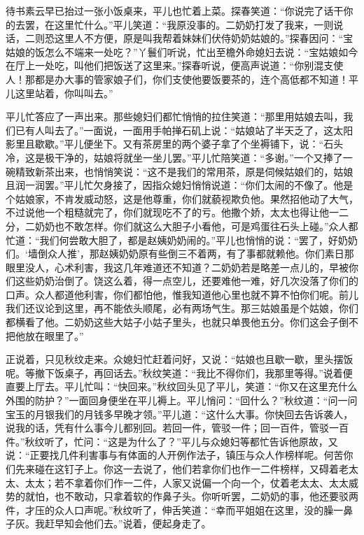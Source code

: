 待书素云早已抬过一张小饭桌来，平儿也忙着上菜。探春笑道：``你说完了话干你的去罢，在这里忙什么。''平儿笑道：``我原没事的。二奶奶打发了我来，一则说话，二则恐这里人不方便，原是叫我帮着妹妹们伏侍奶奶姑娘的。''探春因问：``宝姑娘的饭怎么不端来一处吃？''丫鬟们听说，忙出至檐外命媳妇去说：``宝姑娘如今在厅上一处吃，叫他们把饭送了这里来。''探春听说，便高声说道：``你别混支使人！那都是办大事的管家娘子们，你们支使他要饭要茶的，连个高低都不知道！平儿这里站着，你叫叫去。''

平儿忙答应了一声出来。那些媳妇们都忙悄悄的拉住笑道：``那里用姑娘去叫，我们已有人叫去了。''一面说，一面用手帕掸石矶上说：``姑娘站了半天乏了，这太阳影里且歇歇。''平儿便坐下。又有茶房里的两个婆子拿了个坐褥铺下，说：``石头冷，这是极干净的，姑娘将就坐一坐儿罢。''平儿忙陪笑道：``多谢。''一个又捧了一碗精致新茶出来，也悄悄笑说：``这不是我们的常用茶，原是伺候姑娘们的，姑娘且润一润罢。''平儿忙欠身接了，因指众媳妇悄悄说道：``你们太闹的不像了。他是个姑娘家，不肯发威动怒，这是他尊重，你们就藐视欺负他。果然招他动了大气，不过说他一个粗糙就完了，你们就现吃不了的亏。他撒个娇，太太也得让他一二分，二奶奶也不敢怎样。你们就这么大胆子小看他，可是鸡蛋往石头上碰。''众人都忙道：``我们何尝敢大胆了，都是赵姨奶奶闹的。''平儿也悄悄的说：``罢了，好奶奶们。`墙倒众人推'，那赵姨奶奶原有些倒三不着两，有了事都就赖他。你们素日那眼里没人，心术利害，我这几年难道还不知道？二奶奶若是略差一点儿的，早被你们这些奶奶治倒了。饶这么着，得一点空儿，还要难他一难，好几次没落了你们的口声。众人都道他利害，你们都怕他，惟我知道他心里也就不算不怕你们呢。前儿我们还议论到这里，再不能依头顺尾，必有两场气生。那三姑娘虽是个姑娘，你们都横看了他。二奶奶这些大姑子小姑子里头，也就只单畏他五分。你们这会子倒不把他放在眼里了。''

正说着，只见秋纹走来。众媳妇忙赶着问好，又说：``姑娘也且歇一歇，里头摆饭呢。等撤下饭桌子，再回话去。''秋纹笑道：``我比不得你们，我那里等得。''说着便直要上厅去。平儿忙叫：``快回来。''秋纹回头见了平儿，笑道：``你又在这里充什么外围的防护？''一面回身便坐在平儿褥上。平儿悄问：``回什么？''秋纹道：``问一问宝玉的月银我们的月钱多早晚才领。''平儿道：``这什么大事。你快回去告诉袭人，说我的话，凭有什么事今儿都别回。若回一件，管驳一件；回一百件，管驳一百件。''秋纹听了，忙问：``这是为什么了？''平儿与众媳妇等都忙告诉他原故，又说：``正要找几件利害事与有体面的人开例作法子，镇压与众人作榜样呢。何苦你们先来碰在这钉子上。你这一去说了，他们若拿你们也作一二件榜样，又碍着老太太、太太；若不拿着你们作一二件，人家又说偏一个向一个，仗着老太太、太太威势的就怕，也不敢动，只拿着软的作鼻子头。你听听罢，二奶奶的事，他还要驳两件，才压的众人口声呢。''秋纹听了，伸舌笑道：``幸而平姐姐在这里，没的臊一鼻子灰。我赶早知会他们去。''说着，便起身走了。

